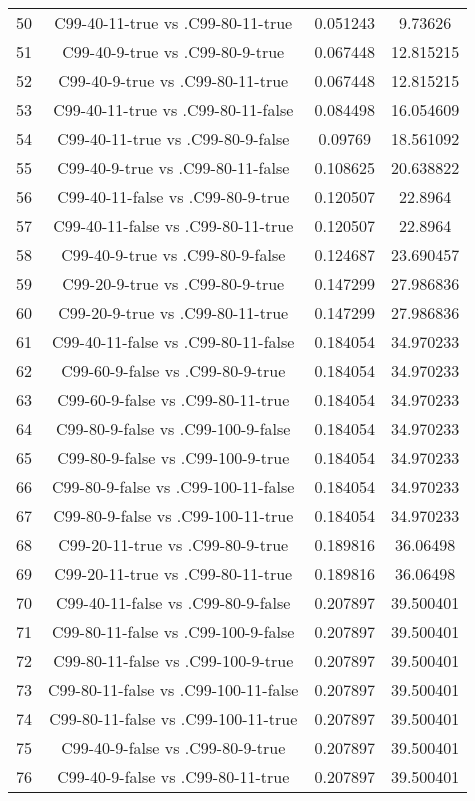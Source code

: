 \documentclass[a4paper,10pt]{article}
\begin{document}
\begin{landscape}
\begin{table}[!htp]
\begin{tabular}{cccc}
50&C99-40-11-true vs .C99-80-11-true&0.051243&9.73626\\
51&C99-40-9-true vs .C99-80-9-true&0.067448&12.815215\\
52&C99-40-9-true vs .C99-80-11-true&0.067448&12.815215\\
53&C99-40-11-true vs .C99-80-11-false&0.084498&16.054609\\
54&C99-40-11-true vs .C99-80-9-false&0.09769&18.561092\\
55&C99-40-9-true vs .C99-80-11-false&0.108625&20.638822\\
56&C99-40-11-false vs .C99-80-9-true&0.120507&22.8964\\
57&C99-40-11-false vs .C99-80-11-true&0.120507&22.8964\\
58&C99-40-9-true vs .C99-80-9-false&0.124687&23.690457\\
59&C99-20-9-true vs .C99-80-9-true&0.147299&27.986836\\
60&C99-20-9-true vs .C99-80-11-true&0.147299&27.986836\\
61&C99-40-11-false vs .C99-80-11-false&0.184054&34.970233\\
62&C99-60-9-false vs .C99-80-9-true&0.184054&34.970233\\
63&C99-60-9-false vs .C99-80-11-true&0.184054&34.970233\\
64&C99-80-9-false vs .C99-100-9-false&0.184054&34.970233\\
65&C99-80-9-false vs .C99-100-9-true&0.184054&34.970233\\
66&C99-80-9-false vs .C99-100-11-false&0.184054&34.970233\\
67&C99-80-9-false vs .C99-100-11-true&0.184054&34.970233\\
68&C99-20-11-true vs .C99-80-9-true&0.189816&36.06498\\
69&C99-20-11-true vs .C99-80-11-true&0.189816&36.06498\\
70&C99-40-11-false vs .C99-80-9-false&0.207897&39.500401\\
71&C99-80-11-false vs .C99-100-9-false&0.207897&39.500401\\
72&C99-80-11-false vs .C99-100-9-true&0.207897&39.500401\\
73&C99-80-11-false vs .C99-100-11-false&0.207897&39.500401\\
74&C99-80-11-false vs .C99-100-11-true&0.207897&39.500401\\
75&C99-40-9-false vs .C99-80-9-true&0.207897&39.500401\\
76&C99-40-9-false vs .C99-80-11-true&0.207897&39.500401\\

\end{tabular}
\end{table}
\end{landscape}
\end{document}
